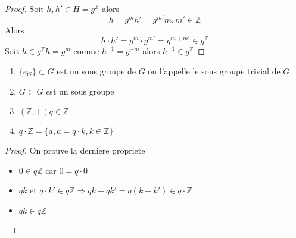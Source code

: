 \documentclass[../main.tex]{subfiles}
\begin{document}
\begin{proof}
Soit $h,h' \in H = g^{\mathbb{Z}}$ alors
\[ 
h= g^{m} h'=g^{m'} m,m'\in \mathbb{Z}
\]
Alors
\[ 
h\cdot h' = g^{m} \cdot g^{m'} = g^{m+m'} \in g^{\mathbb{Z}}
\]
Soit $h\in g^{\mathbb{Z}} h=g^{m}$
comme $h^{-1} = g^{-m}$ alors $h^{-1} \in g^{\mathbb{Z}}$
\end{proof}
\begin{exemple}
	\begin{enumerate}
		\item $\{e_G\}\subset G$ est un sous groupe de $G$ on l'appelle le sous groupe trivial de $G$.\\
		\item $G\subset G$ est un sous groupe \\
		\item $(\mathbb{Z},+) q \in \mathbb{Z}$ \\
		\item $q\cdot \mathbb{Z} = \{a, a=q\cdot k, k\in \mathbb{Z}\}$
	\end{enumerate}
	
\end{exemple}
\begin{proof}
On prouve la derniere propriete
\begin{itemize}
	\item $0 \in q \mathbb{Z}$ car $0=q\cdot 0$ \\
	\item $qk$ et $q\cdot k' \in q\mathbb{Z} \Rightarrow qk + qk'=q(k+k') \in q\cdot \mathbb{Z}$ \\
	\item $qk \in q\mathbb{Z}$
\end{itemize}
\end{proof}
\end{document}
